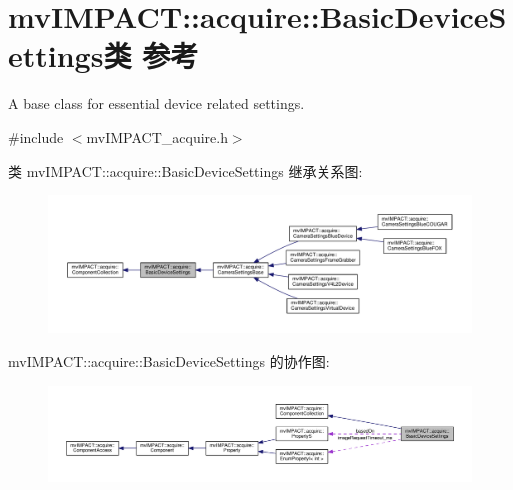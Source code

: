 \hypertarget{classmv_i_m_p_a_c_t_1_1acquire_1_1_basic_device_settings}{\section{mv\+I\+M\+P\+A\+C\+T\+:\+:acquire\+:\+:Basic\+Device\+Settings类 参考}
\label{classmv_i_m_p_a_c_t_1_1acquire_1_1_basic_device_settings}
}


A base class for essential device related settings.  




{\ttfamily \#include $<$mv\+I\+M\+P\+A\+C\+T\+\_\+acquire.\+h$>$}



类 mv\+I\+M\+P\+A\+C\+T\+:\+:acquire\+:\+:Basic\+Device\+Settings 继承关系图\+:
\nopagebreak
\begin{figure}[H]
\begin{center}
\leavevmode
\includegraphics[width=350pt]{classmv_i_m_p_a_c_t_1_1acquire_1_1_basic_device_settings__inherit__graph}
\end{center}
\end{figure}


mv\+I\+M\+P\+A\+C\+T\+:\+:acquire\+:\+:Basic\+Device\+Settings 的协作图\+:
\nopagebreak
\begin{figure}[H]
\begin{center}
\leavevmode
\includegraphics[width=350pt]{classmv_i_m_p_a_c_t_1_1acquire_1_1_basic_device_settings__coll__graph}
\end{center}
\end{figure}

